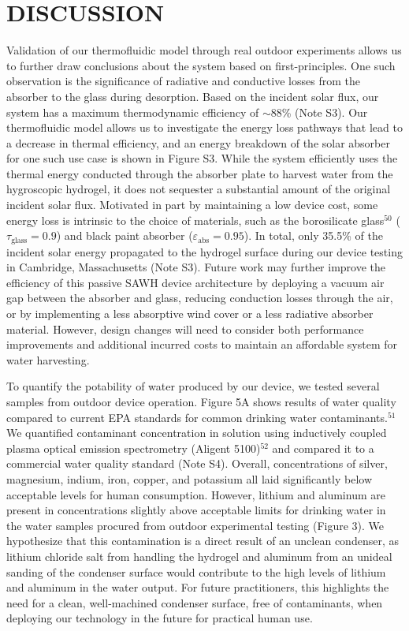 \documentclass[11pt]{article}
\begin{document}
\section{DISCUSSION}

Validation of our thermofluidic model through real outdoor experiments allows us to further draw conclusions about the system based on first-principles. One such observation is the significance of radiative and conductive losses from the absorber to the glass during desorption. Based on the incident solar flux, our system has a maximum thermodynamic efficiency of $\sim$88\% (Note S3). Our thermofluidic model allows us to investigate the energy loss pathways that lead to a decrease in thermal efficiency, and an energy breakdown of the solar absorber for one such use case is shown in Figure S3. While the system efficiently uses the thermal energy conducted through the absorber plate to harvest water from the hygroscopic hydrogel, it does not sequester a substantial amount of the original incident solar flux. Motivated in part by maintaining a low device cost, some energy loss is intrinsic to the choice of materials, such as the borosilicate glass$^{50}$ ($\tau_{\mathrm{glass}} = 0.9$) and black paint absorber ($\varepsilon_{\mathrm{abs}} = 0.95$). In total, only 35.5\% of the incident solar energy propagated to the hydrogel surface during our device testing in Cambridge, Massachusetts (Note S3). Future work may further improve the efficiency of this passive SAWH device architecture by deploying a vacuum air gap between the absorber and glass, reducing conduction losses through the air, or by implementing a less absorptive wind cover or a less radiative absorber material. However, design changes will need to consider both performance improvements and additional incurred costs to maintain an affordable system for water harvesting.

To quantify the potability of water produced by our device, we tested several samples from outdoor device operation. Figure 5A shows results of water quality compared to current EPA standards for common drinking water contaminants.$^{51}$ We quantified contaminant concentration in solution using inductively coupled plasma optical emission spectrometry (Aligent 5100)$^{52}$ and compared it to a commercial water quality standard (Note S4). Overall, concentrations of silver, magnesium, indium, iron, copper, and potassium all laid significantly below acceptable levels for human consumption. However, lithium and aluminum are present in concentrations slightly above acceptable limits for drinking water in the water samples procured from outdoor experimental testing (Figure 3). We hypothesize that this contamination is a direct result of an unclean condenser, as lithium chloride salt from handling the hydrogel and aluminum from an unideal sanding of the condenser surface would contribute to the high levels of lithium and aluminum in the water output. For future practitioners, this highlights the need for a clean, well-machined condenser surface, free of contaminants, when deploying our technology in the future for practical human use.
\end{document}
